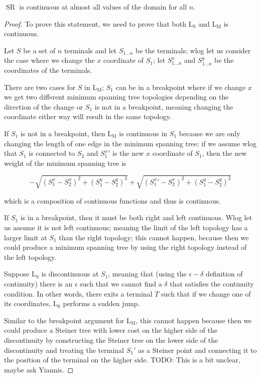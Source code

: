 \documentclass{mpaper}
\begin{document}
\begin{lemma}
  $\operatorname{SR}$ is continuous at almost all values of the domain for all $n$.
\end{lemma}
\begin{proof}
  To prove this statement, we need to prove that both $\operatorname{L_S}$ and $\operatorname{L_M}$ is continuous.

  Let $S$ be a set of $n$ terminals and let $S_{1\dots n}$ be the terminals; wlog let us consider the case where we change the $x$ coordinate of $S_1$; let $S_{1\dots n}^x$ and $S_{1\dots n}^y$ be the coordinates of the terminals.

  There are two cases for $S$ in $\operatorname{L_M}$; $S_1$ can be in a breakpoint where if we change $x$ we get two different minimum spanning tree topologies depending on the direction of the change or $S_1$ is not in a breakpoint, meaning changing the coordinate either way will result in the same topology.

  If $S_1$ is not in a breakpoint, then $\operatorname{L_M}$ is continuous in $S_1$ because we are only changing the length of one edge in the minimum spanning tree; if we assume wlog that $S_1$ is connected to $S_2$ and ${S_1^x}'$ is the new $x$ coordinate of $S_1$, then the new weight of the minimum spanning tree is
  
  $$-\sqrt{(S_1^x-S_2^x)^2 + (S_1^y-S_2^y)^2} + \sqrt{({S_1^x}'-S_2^x)^2 + (S_1^y-S_2^y)^2}$$

  which is a composition of continuous functions and thus is continuous.

  If $S_1$ is in a breakpoint, then it must be both right and left continuous. Wlog let us assume it is not left continuous; meaning the limit of the left topology has a larger limit at $S_1$ than the right topology; this cannot happen, because then we could produce a minimum spanning tree by using the right topology instead of the left topology.


  Suppose $\operatorname{L_S}$ is discontinuous at $S_1$, meaning that (using the $\epsilon-\delta$  definition of continuity) there is an $\epsilon$ such that we cannot find a $\delta$ that satisfies the continuity condition. In other words, there exits a terminal $T$ such that if we change one of its coordinates, $\operatorname{L_S}$ performs a sudden jump. 

  Similar to the breakpoint argument for $\operatorname{L_M}$, this cannot happen because then we could produce a Steiner tree with lower cost on the higher side of the discontinuity by constructing the Steiner tree on the lower side of the discontinuity and treating the terminal  $S_1'$ as a Steiner point and connecting it to the position of the terminal on the higher side. TODO: This is a bit unclear, maybe ask Yiannis.


\end{proof}
\end{document}
